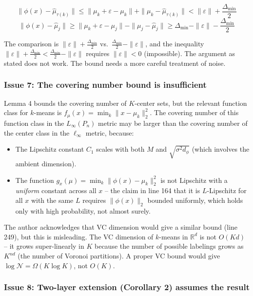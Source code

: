 \documentclass[
  12pt,
]{article}
\providecommand{\tightlist}{%
  \setlength{\itemsep}{0pt}\setlength{\parskip}{0pt}}
\begin{document}
\[\|\phi(x) - \hat{\mu}_{\tau(k)}\| \leq \|\mu_k + \varepsilon - \mu_k\| + \|\mu_k - \hat{\mu}_{\tau(k)}\| < \|\varepsilon\| + \frac{\Delta_{\min}}{2}\]
\[\|\phi(x) - \hat{\mu}_j\| \geq \|\mu_k + \varepsilon - \mu_j\| - \|\mu_j - \hat{\mu}_j\| \geq \Delta_{\min} - \|\varepsilon\| - \frac{\Delta_{\min}}{2}\]

The comparison is \(\|\varepsilon\| + \frac{\Delta_{\min}}{2}\)
vs.~\(\frac{\Delta_{\min}}{2} - \|\varepsilon\|\), and the inequality
\(\|\varepsilon\| + \frac{\Delta_{\min}}{2} < \frac{\Delta_{\min}}{2} - \|\varepsilon\|\)
requires \(\|\varepsilon\| < 0\) (impossible). The argument as stated
does not work. The bound needs a more careful treatment of noise.

\subsubsection{Issue 7: The covering number bound is
insufficient}\label{issue-7-the-covering-number-bound-is-insufficient}

Lemma 4 bounds the covering number of \(K\)-center sets, but the
relevant function class for \(k\)-means is
\(f_\mu(x) = \min_k \|x - \mu_k\|_2^2\). The covering number of this
function class in the \(L_\infty(P_n)\) metric may be larger than the
covering number of the center class in the \(\ell_\infty\) metric,
because:

\begin{itemize}
\tightlist
\item
  The Lipschitz constant \(C_1\) scales with both \(M\) and
  \(\sqrt{\sigma^2 d_\phi}\) (which involves the ambient dimension).
\item
  The function \(g_x(\mu) = \min_k \|\phi(x) - \mu_k\|_2^2\) is not
  Lipschitz with a \emph{uniform} constant across all \(x\) -- the claim
  in line 164 that it is \(L\)-Lipschitz for all \(x\) with the same
  \(L\) requires \(\|\phi(x)\|_2\) bounded uniformly, which holds only
  with high probability, not almost surely.
\end{itemize}

The author acknowledges that VC dimension would give a similar bound
(line 249), but this is misleading. The VC dimension of \(k\)-means in
\(\mathbb{R}^d\) is not \(O(Kd)\) -- it grows super-linearly in \(K\)
because the number of possible labelings grows as \(K^{nd}\) (the number
of Voronoi partitions). A proper VC bound would give
\(\log \mathcal{N} = \Omega(K \log K)\), not \(O(K)\).

\subsubsection{Issue 8: Two-layer extension (Corollary 2) assumes the
result}\label{issue-8-two-layer-extension-corollary-2-assumes-the-result}
\end{document}
